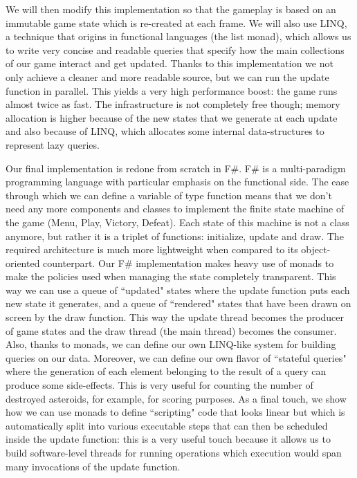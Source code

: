 We will then modify this implementation so that the gameplay is based on an immutable game state which is re-created at each frame. We will also use LINQ, a technique that origins in functional languages (the list monad), which allows us to write very concise and readable queries that specify how the main collections of our game interact and get updated. Thanks to this implementation we not only achieve a cleaner and more readable source, but we can run the update function in parallel. This yields a very high performance boost: the game runs almost twice as fast. The infrastructure is not completely free though; memory allocation is higher because of the new states that we generate at each update and also because of LINQ, which allocates some internal data-structures to represent lazy queries.

Our final implementation is redone from scratch in F\#. F\# is a multi-paradigm programming language with particular emphasis on the functional side. The ease through which we can define a variable of type function means that we don't need any more components and classes to implement the finite state machine of the game (Menu, Play, Victory, Defeat). Each state of this machine is not a class anymore, but rather it is a triplet of functions: initialize, update and draw. The required architecture is much more lightweight when compared to its object-oriented counterpart. Our F\# implementation makes heavy use of monads to make the policies used when managing the state completely transparent. This way we can use a queue of ``updated" states where the update function puts each new state it generates, and a queue of ``rendered" states that have been drawn on screen by the draw function. This way the update thread becomes the producer of game states and the draw thread (the main thread) becomes the consumer. Also, thanks to monads, we can define our own LINQ-like system for building queries on our data. Moreover, we can define our own flavor of ``stateful queries" where the generation of each element belonging to the result of a query can produce some side-effects. This is very useful for counting the number of destroyed asteroids, for example, for scoring purposes. As a final touch, we show how we can use monads to define ``scripting" code that looks linear but which is automatically split into various executable steps that can then be scheduled inside the update function: this is a very useful touch because it allows us to build software-level threads for running operations which execution would span many invocations of the update function.

